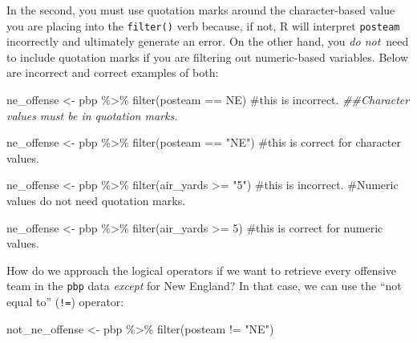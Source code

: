 \documentclass[
  letterpaper,
]{krantz}
\newenvironment{Shaded}{\begin{snugshade}}{\end{snugshade}}
\newcommand{\CommentTok}[1]{\textcolor[rgb]{0.37,0.37,0.37}{#1}}
\newcommand{\DecValTok}[1]{\textcolor[rgb]{0.68,0.00,0.00}{#1}}
\newcommand{\DocumentationTok}[1]{\textcolor[rgb]{0.37,0.37,0.37}{\textit{#1}}}
\newcommand{\FunctionTok}[1]{\textcolor[rgb]{0.28,0.35,0.67}{#1}}
\newcommand{\NormalTok}[1]{\textcolor[rgb]{0.00,0.23,0.31}{#1}}
\newcommand{\OtherTok}[1]{\textcolor[rgb]{0.00,0.23,0.31}{#1}}
\newcommand{\SpecialCharTok}[1]{\textcolor[rgb]{0.37,0.37,0.37}{#1}}
\newcommand{\StringTok}[1]{\textcolor[rgb]{0.13,0.47,0.30}{#1}}
\begin{document}
In the second, you must use quotation marks around the character-based
value you are placing into the \texttt{filter()} verb because, if not, R
will interpret \texttt{posteam} incorrectly and ultimately generate an
error. On the other hand, you \emph{do not}~need to include quotation
marks if you are filtering out numeric-based variables. Below are
incorrect and correct examples of both:

\begin{Shaded}
\begin{Highlighting}[]
\NormalTok{ne\_offense }\OtherTok{\textless{}{-}}\NormalTok{ pbp }\SpecialCharTok{\%\textgreater{}\%}
  \FunctionTok{filter}\NormalTok{(posteam }\SpecialCharTok{==}\NormalTok{ NE) }\CommentTok{\#this is incorrect.}
                        \DocumentationTok{\#\#Character values must be in quotation marks.}

\NormalTok{ne\_offense }\OtherTok{\textless{}{-}}\NormalTok{ pbp }\SpecialCharTok{\%\textgreater{}\%}
  \FunctionTok{filter}\NormalTok{(posteam }\SpecialCharTok{==} \StringTok{"NE"}\NormalTok{) }\CommentTok{\#this is correct for character values.}

\NormalTok{ne\_offense }\OtherTok{\textless{}{-}}\NormalTok{ pbp }\SpecialCharTok{\%\textgreater{}\%}
  \FunctionTok{filter}\NormalTok{(air\_yards }\SpecialCharTok{\textgreater{}=} \StringTok{"5"}\NormalTok{) }\CommentTok{\#this is incorrect.}
                           \CommentTok{\#Numeric values do not need quotation marks.}

\NormalTok{ne\_offense }\OtherTok{\textless{}{-}}\NormalTok{ pbp }\SpecialCharTok{\%\textgreater{}\%}
  \FunctionTok{filter}\NormalTok{(air\_yards }\SpecialCharTok{\textgreater{}=} \DecValTok{5}\NormalTok{) }\CommentTok{\#this is correct for numeric values.}
\end{Highlighting}
\end{Shaded}

How do we approach the logical operators if we want to retrieve every
offensive team in the \texttt{pbp} data \emph{except} for New England?
In that case, we can use the ``not equal to'' (\texttt{!=}) operator:

\begin{Shaded}
\begin{Highlighting}[]
\NormalTok{not\_ne\_offense }\OtherTok{\textless{}{-}}\NormalTok{ pbp }\SpecialCharTok{\%\textgreater{}\%}
  \FunctionTok{filter}\NormalTok{(posteam }\SpecialCharTok{!=} \StringTok{"NE"}\NormalTok{)}
\end{Highlighting}
\end{Shaded}
\end{document}
